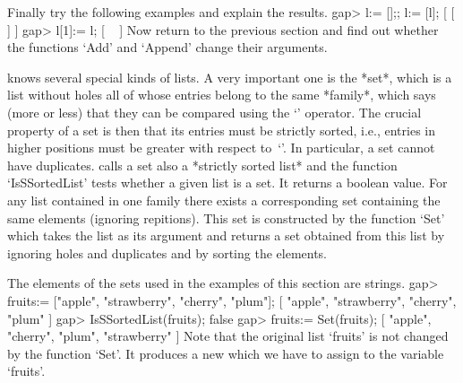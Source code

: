Finally try the following examples and explain the results.
\beginexample
    gap> l:= [];; l:= [l];
    [ [  ] ]
    gap> l[1]:= l;
    [ ~ ]
\endexample
Now return to the  previous section and   find out whether the  functions
`Add' and `Append' change their arguments.


{\GAP} knows several special kinds of lists.  A very important one is the
*set*, which is a list without holes  all of whose  entries belong to the
same *family*,
%
which says (more  or less)  that they   can be  compared using  the  `\<'
operator. The crucial property of a set is then that  its entries must be
strictly sorted, i.e.,  entries in higher positions  must be greater with
respect  to~`\<'. In  particular,  a set  cannot have duplicates.  {\GAP}
calls a set also a *strictly sorted list*
%
and the function `IsSSortedList' tests whether a given  list is a set. It
returns  a boolean value.  For  any list  contained  in one family  there
exists a  corresponding   set containing  the  same   elements  (ignoring
repitions). This set is constructed by the function `Set' which takes the
list as   its argument and   returns a set  obtained  from this   list by
ignoring holes and duplicates and by sorting the elements.

The  elements  of  the  sets used  in  the  examples of this  section are
strings.
\beginexample
    gap> fruits:= ["apple", "strawberry", "cherry", "plum"];
    [ "apple", "strawberry", "cherry", "plum" ]
    gap> IsSSortedList(fruits);
    false
    gap> fruits:= Set(fruits);
    [ "apple", "cherry", "plum", "strawberry" ] 
\endexample
Note  that the  original list `fruits'  is not  changed  by the  function
`Set'.  It   produces a new  which  we  have to   assign to  the variable
`fruits'.

